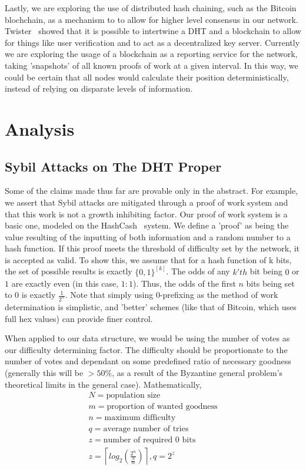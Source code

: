 \documentclass[10pt]{IEEEtran}
\providecommand{\myceil}[1]{\left \lceil #1 \right \rceil }
\begin{document}
\par Lastly, we are exploring the use of distributed hash chaining, such as the Bitcoin blochchain, as a mechanism to to allow for higher level consensus in our network. Twister~\cite{Freitas:2013tb} showed that it is possible to intertwine a DHT and a blockchain to allow for things like user verification and to act as a decentralized key server. Currently we are exploring the usage of a blockchain as a reporting service for the network, taking 'snapshots' of all known proofs of work at a given interval. In this way, we could be certain that all nodes would calculate their position deterministically, instead of relying on disparate levels of information.

\section{Analysis}
\subsection{Sybil Attacks on The DHT Proper}
\par Some of the claims made thus far are provable only in the abstract. For example, we assert that Sybil attacks are mitigated through a proof of work system and that this work is not a growth inhibiting factor. Our proof of work system is a basic one, modeled on the HashCash~\cite{Back:2002vq} system. We define a 'proof' as being the value resulting of the inputting of both information and a random number to a hash function. If this proof meets the threshold of difficulty set by the network, it is accepted as valid. To show this, we assume that for a hash function of k bits, the set of possible results is exactly $\{0,1\}^{[k]}$. The odds of any $k'th$ bit being $0$ or $1$ are exactly even (in this case, $1:1$). Thus, the odds of the first $n$ bits being set to 0 is exactly $\frac{1}{2^n}$. Note that simply using $0$-prefixing as the method of work determination is simplistic, and 'better' schemes (like that of Bitcoin, which uses full hex values) can provide finer control. 

\par When applied to our data structure, we would be using the number of votes as our difficulty determining factor. The difficulty should be proportionate to the number of votes and dependant on some predefined ratio of necessary goodness (generally this will be $ > 50\%$, as a result of the Byzantine general problem's theoretical limits in the general case\cite{Lamport:1982fr}). Mathematically,
\begin{multline}
N = \textrm{population size} \\
m = \textrm{proportion of wanted goodness} \\
n = \textrm{maximum difficulty} \\
q = \textrm{average number of tries} \\
z = \textrm{number of required 0 bits} \\
z = \myceil{log_2{ (\frac{2^n}{\frac{N}{m}})}}, q = 2^z \\
\end{multline}
\end{document}
